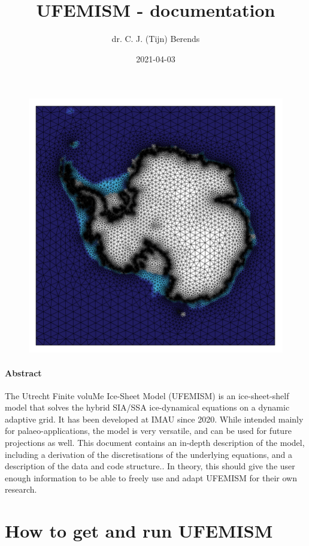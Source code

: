\documentclass{article}
\title{UFEMISM - documentation}
\date{2021-04-03}
\author{dr. C. J. (Tijn) Berends}
\begin{document}
  \maketitle

  \begin{figure}[H]
    \centering
    \includegraphics[width=0.8\linewidth]{Fig_UFEMISM.png}
  \end{figure}  

  \paragraph{Abstract}
  
The Utrecht Finite voluMe Ice-Sheet Model (UFEMISM) is an ice-sheet-shelf model that solves the hybrid SIA/SSA ice-dynamical equations on a dynamic adaptive grid. It has been developed at IMAU since 2020. While intended mainly for palaeo-applications, the model is very versatile, and can be used for future projections as well. This document contains an in-depth description of the model, including a derivation of the discretisations of  the underlying equations, and a description of the data and code structure.. In theory, this should give the user enough information to be able to freely use and adapt UFEMISM for their own research.
  
\newpage
\tableofcontents

\newpage
{}

\section{How to get and run UFEMISM}
\end{document}
